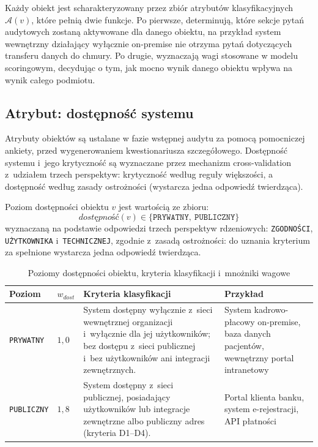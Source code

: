 Każdy obiekt jest scharakteryzowany przez zbiór atrybutów
klasyfikacyjnych $\mathcal{A}(v)$, które pełnią dwie funkcje.
Po pierwsze, determinują, które sekcje pytań audytowych
zostaną aktywowane dla danego obiektu, na przykład 
system wewnętrzny działający wyłącznie on-premise nie 
otrzyma pytań dotyczących transferu 
danych do chmury. Po drugie, wyznaczają wagi stosowane 
w modelu scoringowym, decydując o tym, jak mocno wynik 
danego obiektu wpływa na wynik całego podmiotu.

\subsection{Atrybut: dostępność systemu}

Atrybuty obiektów są ustalane w fazie wstępnej audytu za pomocą pomocniczej ankiety, 
przed wygenerowaniem kwestionariusza szczegółowego. 
Dostępność systemu i~jego krytyczność są wyznaczane przez mechanizm cross-validation z~udziałem trzech perspektyw: krytyczność według reguły większości, a dostępność według zasady ostrożności (wystarcza jedna odpowiedź twierdząca).


\begin{definition}
Poziom dostępności obiektu $v$ jest wartością ze zbioru:
\[
\textit{dostępność}(v) \in 
\{\texttt{PRYWATNY},\ \texttt{PUBLICZNY}\}
\]
wyznaczaną na podstawie odpowiedzi trzech perspektyw rdzeniowych: 
\texttt{ZGODNOŚCI}, \texttt{UŻYTKOWNIKA} i~\texttt{TECHNICZNEJ}, 
zgodnie z~zasadą ostrożności: do uznania kryterium za spełnione 
wystarcza jedna odpowiedź twierdząca. 
\end{definition}


\begin{table}[H]
\centering
\caption{Poziomy dostępności obiektu, kryteria klasyfikacji
         i~mnożniki wagowe}
\label{tab:dostepnosc}
\renewcommand{\arraystretch}{1.5}
\begin{tabular}{p{2.8cm}p{1.5cm}p{4.5cm}p{4cm}}
\toprule
\textbf{Poziom} & \textbf{$w_{dost}$}
& \textbf{Kryteria klasyfikacji}
& \textbf{Przykład} \\
\midrule
\texttt{PRYWATNY} & $1{,}0$ 
& System dostępny wyłącznie z~sieci wewnętrznej organizacji 
  i~wyłącznie dla jej użytkowników; bez dostępu z~sieci 
  publicznej i~bez użytkowników ani integracji zewnętrznych.
& System kadrowo-płacowy on-premise, baza danych pacjentów, 
  wewnętrzny portal intranetowy \\
\midrule
\texttt{PUBLICZNY} & $1{,}8$ 
& System dostępny z~sieci publicznej, posiadający 
  użytkowników lub integracje zewnętrzne albo publiczny 
  adres (kryteria D1--D4).
& Portal klienta banku, system e-rejestracji, API płatności \\

\bottomrule
\end{tabular}
\end{table}

